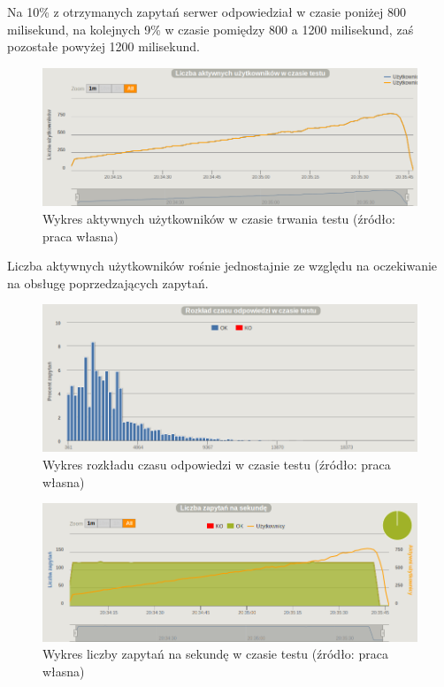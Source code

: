 \documentclass[12pt,twoside]{article}
\begin{document}
Na 10\% z otrzymanych zapytań serwer odpowiedział w czasie poniżej 800
milisekund, na kolejnych 9\% w czasie pomiędzy 800 a 1200 milisekund,
zaś pozostałe powyżej 1200 milisekund.

\begin{figure}[htbp]
\centering
\includegraphics[resolution=150]{test_results/js/file/screenshots/active_users.png}
\caption{Wykres aktywnych użytkowników w czasie trwania testu (źródło: praca własna)}
\end{figure}

Liczba aktywnych użytkowników rośnie jednostajnie ze względu na
oczekiwanie na obsługę poprzedzających zapytań.

\begin{figure}[htbp]
\centering
\includegraphics[resolution=150]{test_results/js/file/screenshots/distribution.png}
\caption{Wykres rozkładu czasu odpowiedzi w czasie testu (źródło: praca własna)}
\end{figure}

\begin{figure}[htbp]
\centering
\includegraphics[resolution=150]{test_results/js/file/screenshots/requests.png}
\caption{Wykres liczby zapytań na sekundę w czasie testu (źródło: praca własna)}
\end{figure}
\end{document}
